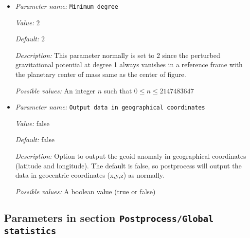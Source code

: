 \begin{itemize}
{\it Description:} This parameter can be a random positive integer. However, the value normally should not exceed the maximum degree of the initial perturbed temperature field. For example, if the initial temperature uses S40RTS, the maximum degree should not be larger than 40.


{\it Possible values:} An integer $n$ such that $0\leq n \leq 2147483647$
\item {\it Parameter name:} {\tt Minimum degree}
\label{parameters:Postprocess/Geoid/Minimum degree}


{\it Value:} 2


{\it Default:} 2


{\it Description:} This parameter normally is set to 2 since the perturbed gravitational potential at degree 1 always vanishes in a reference frame with the planetary center of mass same as the center of figure.


{\it Possible values:} An integer $n$ such that $0\leq n \leq 2147483647$
\item {\it Parameter name:} {\tt Output data in geographical coordinates}
\label{parameters:Postprocess/Geoid/Output data in geographical coordinates}


{\it Value:} false


{\it Default:} false


{\it Description:} Option to output the geoid anomaly in geographical coordinates (latitude and longitude). The default is false, so postprocess will output the data in geocentric coordinates (x,y,z) as normally.


{\it Possible values:} A boolean value (true or false)
\end{itemize}

\subsection{Parameters in section \tt Postprocess/Global statistics}
\label{parameters:Postprocess/Global_20statistics}

